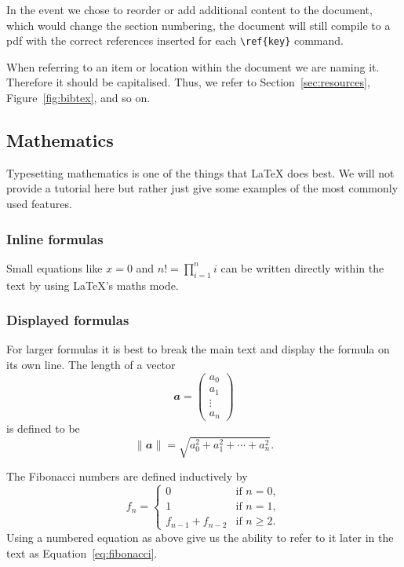 \documentclass[12pt]{article}
\theoremstyle{plain}
\theoremstyle{definition}
\begin{document}
In the event we chose to reorder or add additional content
to the document, which would change the section numbering, the
document will still compile to a pdf with the correct references
inserted for each \verb|\ref{key}| command.

When referring to an item or location within the document we are
naming it. Therefore it should be capitalised. Thus, we refer to
Section~\ref{sec:resources}, Figure~\ref{fig:bibtex}, and so on.

\subsection{Mathematics}
\label{sec:typesetting_maths}

Typesetting mathematics is one of the things that LaTeX does best. We
will not provide a tutorial here but rather just give some examples of
the most commonly used features.

\subsubsection{Inline formulas}

Small equations like \(x = 0\) and \(n! = \prod_{i=1}^n i\) can be
written directly within the text by using LaTeX's maths mode.

\subsubsection{Displayed formulas}

For larger formulas it is best to break the main text and display the
formula on its own line. The length of a vector 
\[
  \mathbfit{a} = \left( \begin{array}{c} a_0\\ a_1\\ \vdots\\
      a_n\end{array} \right)
\] is defined to be
\[
  \| \mathbfit{a} \| = \sqrt{a_0^2 + a_1^2 + \cdots + a_n^2}.
\]

The Fibonacci numbers are defined inductively by
\begin{equation}
  \label{eq:fibonacci}
  f_n = \left\{
    \begin{array}{ll}
      0 &\text{if } n = 0,\\
      1 &\text{if } n = 1,\\
      f_{n-1}+f_{n-2} &\text{if } n \ge 2.
    \end{array}
  \right.
\end{equation}
Using a numbered equation as above give us the ability to refer to it
later in the text as Equation~\ref{eq:fibonacci}.
\end{document}
